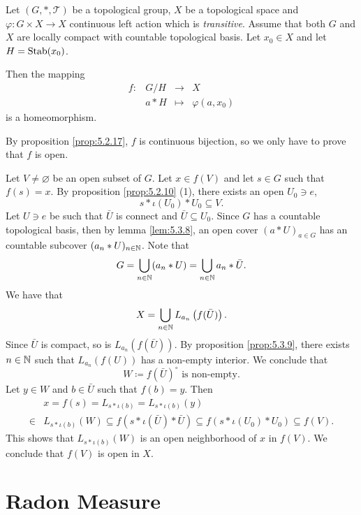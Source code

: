 \begin{propositionenv}
    Let $(G,*,\mathscr{T})$ be a topological group,
    $X$ be a topological space and $\varphi : G \times X \rightarrow X$ continuous left action which is \textit{transitive}.
    Assume that both $G$ and $X$ are locally compact with countable topological basis.
    Let $x_0 \in X$ and let $H = \operatorname{\mathrm{Stab}}(x_0)$.
    
    \quad Then the mapping
    $$\begin{array}{rrcl}
        f : & G/H & \rightarrow & X\\
        & a * H & \longmapsto & \varphi (a,x_0)
    \end{array}$$
    is a homeomorphism.
\end{propositionenv}
\begin{proofenv}
    By proposition \ref{prop:5.2.17}, $f$ is continuous bijection,
    so we only have to prove that $f$ is open.

    \quad Let $V \neq \varnothing$ be an open subset of $G$.
    Let $x \in f (V)$ and let $s \in G$ such that $f(s) = x$.
    By proposition \ref{prop:5.2.10} (1), there exists an open $U_{0} \ni e$,
    $$s * \iota(U_{0}) * U_{0} \subseteq V.$$
    Let $U \ni e$ be such that $\bar{U}$ is connect and $\bar{U} \subseteq U_0$.
    Since $G$ has a countable topological basis, then by lemma \ref{lem:5.3.8}, an open cover $(a * U)_{a \in G}$ has an countable subcover $(a_n * U)_{n \in \mathbb{N}}$.
    Note that
    $$G = \bigcup_{n \in \mathbb{N}} (a_n * U) = \bigcup_{n \in \mathbb{N}} a_{n} * \bar{U}.$$
    We have that
    $$X = \bigcup_{n \in \mathbb{N}} L_{a_{n}} \left(f(\bar{U})\right).$$
    Since $\bar{U}$ is compact, so is $L_{a_{n}} \left(f(\bar{U})\right)$.
    By proposition \ref{prop:5.3.9}, there exists $n \in \mathbb{N}$ such that $L_{a_{n}}\left(f(U)\right)$ has a non-empty interior.
    We conclude that
    $$ W \coloneq f(\bar{U})^\circ \text{ is non-empty.}$$
    Let $y \in W$ and $b \in \bar{U}$ such that $f(b) = y$.
    Then
    $$\begin{aligned}
        & x = f(s) = L_{s * \iota(b)} = L_{s * \iota(b)}(y)\\
        \in & L_{s * \iota(b)}(W) \subseteq f(s * \iota(\bar{U}) * \bar{U}) \subseteq f(s * \iota(U_0) * U_0) \subseteq f(V).
    \end{aligned}$$
    This shows that $L_{s * \iota(b)}(W)$ is an open neighborhood of $x$ in $f(V)$.
    We conclude that $f(V)$ is open in $X$.
\end{proofenv}


\section{Radon Measure}


